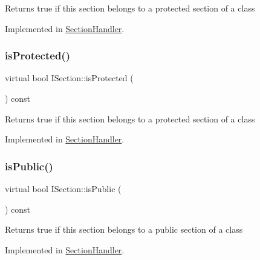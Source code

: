 Returns {\ttfamily true} if this section belongs to a protected section of a class 

Implemented in \mbox{\hyperlink{class_section_handler_a60e5737210382b9496d9d012cbd56a13}{Section\+Handler}}.

\mbox{\label{class_i_section_afdd0506cd65ce59c8fecc060ef813592}} 
\subsubsection{\texorpdfstring{isProtected()}{isProtected()}\hspace{0.1cm}{\footnotesize\ttfamily [2/2]}}
{\footnotesize\ttfamily virtual bool I\+Section\+::is\+Protected (\begin{DoxyParamCaption}{ }\end{DoxyParamCaption}) const\hspace{0.3cm}{\ttfamily [pure virtual]}}

Returns {\ttfamily true} if this section belongs to a protected section of a class 

Implemented in \mbox{\hyperlink{class_section_handler_a60e5737210382b9496d9d012cbd56a13}{Section\+Handler}}.

\mbox{\label{class_i_section_a09f6dd61327d0cf67404cde8476be7a1}} 
\subsubsection{\texorpdfstring{isPublic()}{isPublic()}\hspace{0.1cm}{\footnotesize\ttfamily [1/2]}}
{\footnotesize\ttfamily virtual bool I\+Section\+::is\+Public (\begin{DoxyParamCaption}{ }\end{DoxyParamCaption}) const\hspace{0.3cm}{\ttfamily [pure virtual]}}

Returns {\ttfamily true} if this section belongs to a public section of a class 

Implemented in \mbox{\hyperlink{class_section_handler_aa6e571779cffbb8337fcbc041d486f63}{Section\+Handler}}.

\mbox{\label{class_i_section_a09f6dd61327d0cf67404cde8476be7a1}} 
